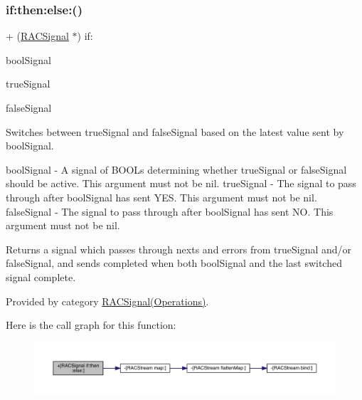 \subsubsection{\texorpdfstring{if\+:then\+:else\+:()}{if:then:else:()}\hspace{0.1cm}{\footnotesize\ttfamily [3/3]}}
{\footnotesize\ttfamily + (\mbox{\hyperlink{interface_r_a_c_signal}{R\+A\+C\+Signal}} $\ast$) if\+: \begin{DoxyParamCaption}\item[{(\mbox{\hyperlink{interface_r_a_c_signal}{R\+A\+C\+Signal}} $\ast$)}]{bool\+Signal }\item[{then:(\mbox{\hyperlink{interface_r_a_c_signal}{R\+A\+C\+Signal}} $\ast$)}]{true\+Signal }\item[{else:(\mbox{\hyperlink{interface_r_a_c_signal}{R\+A\+C\+Signal}} $\ast$)}]{false\+Signal }\end{DoxyParamCaption}}

Switches between {\ttfamily true\+Signal} and {\ttfamily false\+Signal} based on the latest value sent by {\ttfamily bool\+Signal}.

bool\+Signal -\/ A signal of B\+O\+O\+Ls determining whether {\ttfamily true\+Signal} or {\ttfamily false\+Signal} should be active. This argument must not be nil. true\+Signal -\/ The signal to pass through after {\ttfamily bool\+Signal} has sent Y\+ES. This argument must not be nil. false\+Signal -\/ The signal to pass through after {\ttfamily bool\+Signal} has sent NO. This argument must not be nil.

Returns a signal which passes through {\ttfamily next}s and {\ttfamily error}s from {\ttfamily true\+Signal} and/or {\ttfamily false\+Signal}, and sends {\ttfamily completed} when both {\ttfamily bool\+Signal} and the last switched signal complete. 

Provided by category \mbox{\hyperlink{category_r_a_c_signal_07_operations_08_a67c14dfcf505999bc53632e336f6cb84}{R\+A\+C\+Signal(\+Operations)}}.

Here is the call graph for this function\+:\nopagebreak
\begin{figure}[H]
\begin{center}
\leavevmode
\includegraphics[width=350pt]{interface_r_a_c_signal_a67c14dfcf505999bc53632e336f6cb84_cgraph}
\end{center}
\end{figure}
\mbox{\label{interface_r_a_c_signal_a2997862d443d16efa3197facb6a354d1}} 
